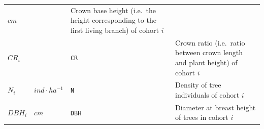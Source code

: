 \documentclass[]{book}
\begin{document}
\begin{longtable}[]{@{}llll@{}}
\begin{minipage}[t]{0.10\columnwidth}
\(cm\)\strut
\end{minipage} & \begin{minipage}[t]{0.12\columnwidth}\raggedright\strut
\strut
\end{minipage} & \begin{minipage}[t]{0.45\columnwidth}\raggedright\strut
Crown base height (i.e.~the height corresponding to the first living
branch) of cohort \(i\)\strut
\end{minipage}\tabularnewline
\begin{minipage}[t]{0.11\columnwidth}\raggedright\strut
\(CR_i\)\strut
\end{minipage} & \begin{minipage}[t]{0.10\columnwidth}\raggedright\strut
\strut
\end{minipage} & \begin{minipage}[t]{0.12\columnwidth}\raggedright\strut
\texttt{CR}\strut
\end{minipage} & \begin{minipage}[t]{0.45\columnwidth}\raggedright\strut
Crown ratio (i.e.~ratio between crown length and plant height) of cohort
\(i\)\strut
\end{minipage}\tabularnewline
\begin{minipage}[t]{0.11\columnwidth}\raggedright\strut
\(N_i\)\strut
\end{minipage} & \begin{minipage}[t]{0.10\columnwidth}\raggedright\strut
\(ind · ha^{-1}\)\strut
\end{minipage} & \begin{minipage}[t]{0.12\columnwidth}\raggedright\strut
\texttt{N}\strut
\end{minipage} & \begin{minipage}[t]{0.45\columnwidth}\raggedright\strut
Density of tree individuals of cohort \(i\)\strut
\end{minipage}\tabularnewline
\begin{minipage}[t]{0.11\columnwidth}\raggedright\strut
\(DBH_i\)\strut
\end{minipage} & \begin{minipage}[t]{0.10\columnwidth}\raggedright\strut
\(cm\)\strut
\end{minipage} & \begin{minipage}[t]{0.12\columnwidth}\raggedright\strut
\texttt{DBH}\strut
\end{minipage} & \begin{minipage}[t]{0.45\columnwidth}\raggedright\strut
Diameter at breast height of trees in cohort \(i\)\strut

\end{minipage}
\end{longtable}
\end{document}
